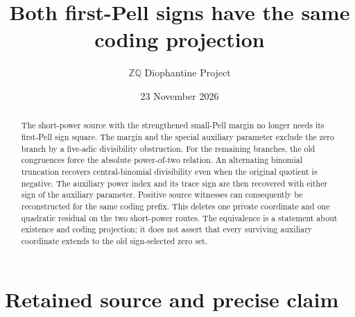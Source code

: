 \documentclass[11pt]{article}
\title{Both first-Pell signs have the same coding projection}
\author{\(\mathbb Z\mathbb Q\) Diophantine Project}
\date{23 November 2026}
\begin{document}
\maketitle

\begin{abstract}
The short-power source with the strengthened small-Pell margin no
longer needs its first-Pell sign square. The margin and the special
auxiliary parameter exclude the zero branch by a five-adic divisibility
obstruction. For the remaining branches, the old congruences force
the absolute power-of-two relation. An alternating binomial truncation
recovers central-binomial divisibility even when the original quotient
is negative. The auxiliary power index and its trace sign are then
recovered with either sign of the auxiliary parameter. Positive source
witnesses can consequently be reconstructed for the same coding prefix.
This deletes one private coordinate and one quadratic residual on the
two short-power routes. The equivalence is a statement about existence
and coding projection; it does not assert that every surviving auxiliary
coordinate extends to the old sign-selected zero set.
\end{abstract}

\section{Retained source and precise claim}
\end{document}
